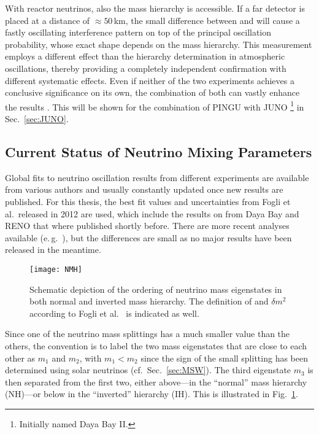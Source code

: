 With reactor neutrinos, also the mass hierarchy is accessible. If a far detector
is placed at a distance of $\approx 50$\,km, the small difference between
 and  will cause a fastly oscillating interference pattern on top
of the principal oscillation probability, whose exact shape depends on the mass
hierarchy. This measurement employs a different effect than the hierarchy
determination in atmospheric oscillations, thereby providing a completely
independent confirmation with different systematic effects. Even if neither of
the two experiments achieves a conclusive significance on its own, the
combination of both can vastly enhance the results \cite{BlennowSchwetz}. This
will be shown for the combination of PINGU with JUNO
\cite{JUNO, JUNO2}\footnote{Initially named Daya Bay II.} in
Sec.~\ref{sec:JUNO}.

\subsection{Current Status of Neutrino Mixing Parameters}
\label{sec:MixingParams}

Global fits to neutrino oscillation results from different experiments are
available from various authors and usually constantly updated once new results
are published. For this thesis, the best fit values and uncertainties from Fogli
et al.\ released in 2012 \cite{Fogli2012} are used, which include the results
on  from Daya Bay and RENO that where published shortly before. There
are more recent analyses available (e.\,g.\ \cite{Capozzi2013,
GonzalezGarcia2014}), but the differences are small as no major results have
been released in the meantime.

\begin{figure}
 \centering
 \texttt{[image: NMH]}
 \caption{Schematic depiction of the ordering of neutrino mass eigenstates in
    both normal and inverted mass hierarchy. The definition of \dm{} and $\delta
    m^2$ according to Fogli et al.\ \cite{Fogli2012} is indicated as well.}
 \label{fig:NMH}
\end{figure} 
Since one of the neutrino mass splittings has a much smaller value than the
others, the convention is to label the two mass eigenstates that are close to
each other as $m_1$ and $m_2$, with $m_1 < m_2$ since the sign of the small
splitting has been determined using solar neutrinos (cf.\ Sec.~\ref{sec:MSW}).
The third eigenstate $m_3$ is then separated from the first two, either
above---in the ``normal'' mass hierarchy (NH)---or below in the ``inverted''
hierarchy (IH). This is illustrated in Fig.~\ref{fig:NMH}.

